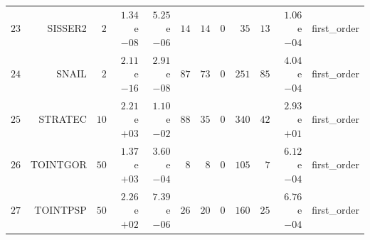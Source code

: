 \begin{longtable}{rrrrrrrrrrrr}
  \(    23\) & SISSER2 & \(     2\) & \( 1.34\)e\(-08\) & \( 5.25\)e\(-06\) & \(    14\) & \(    14\) & \(     0\) & \(    35\) & \(    13\) & \( 1.06\)e\(-04\) & first\_order \\
  \(    24\) & SNAIL & \(     2\) & \( 2.11\)e\(-16\) & \( 2.91\)e\(-08\) & \(    87\) & \(    73\) & \(     0\) & \(   251\) & \(    85\) & \( 4.04\)e\(-04\) & first\_order \\
  \(    25\) & STRATEC & \(    10\) & \( 2.21\)e\(+03\) & \( 1.10\)e\(-02\) & \(    88\) & \(    35\) & \(     0\) & \(   340\) & \(    42\) & \( 2.93\)e\(+01\) & first\_order \\
  \(    26\) & TOINTGOR & \(    50\) & \( 1.37\)e\(+03\) & \( 3.60\)e\(-04\) & \(     8\) & \(     8\) & \(     0\) & \(   105\) & \(     7\) & \( 6.12\)e\(-04\) & first\_order \\
  \(    27\) & TOINTPSP & \(    50\) & \( 2.26\)e\(+02\) & \( 7.39\)e\(-06\) & \(    26\) & \(    20\) & \(     0\) & \(   160\) & \(    25\) & \( 6.76\)e\(-04\) & first\_order \\\hline
\end{longtable}
